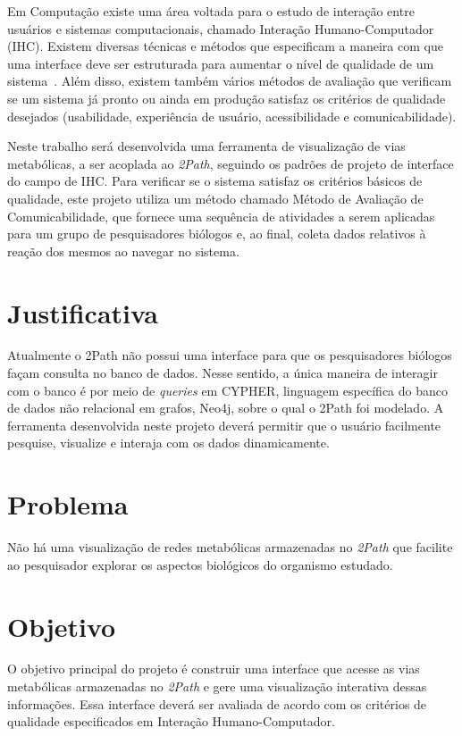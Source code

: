 \indent Em Computação existe uma área voltada para o estudo de interação entre usuários e sistemas computacionais, chamado Interação Humano-Computador (IHC). Existem diversas técnicas e métodos que especificam a maneira com que uma interface deve ser estruturada para aumentar o nível de qualidade de um sistema~\cite{IHCbook}. Além disso, existem também vários métodos de avaliação que verificam se um sistema já pronto ou ainda em produção satisfaz os critérios de qualidade~\cite{IHCbook} desejados (usabilidade, experiência de usuário, acessibilidade e comunicabilidade).

\indent Neste trabalho será desenvolvida uma ferramenta de visualização de vias metabólicas, a ser acoplada ao \textit{2Path}, seguindo os padrões de projeto de interface do campo de IHC. Para verificar se o sistema satisfaz os critérios básicos de qualidade, este projeto utiliza um método chamado Método de Avaliação de Comunicabilidade, que fornece uma sequência de atividades a serem aplicadas para um grupo de pesquisadores biólogos e, ao final, coleta dados relativos à reação dos mesmos ao navegar no sistema.


\section{Justificativa}
\indent Atualmente o 2Path não possui uma interface para que os pesquisadores biólogos façam consulta no banco de dados. Nesse sentido, a única maneira de interagir com o banco é por meio de \textit{queries} em CYPHER, linguagem específica do banco de dados não relacional em grafos, Neo4j, sobre o qual o 2Path foi modelado. A ferramenta desenvolvida neste projeto deverá permitir que o usuário facilmente pesquise, visualize e interaja com os dados dinamicamente.

\section{Problema}
\indent Não há uma visualização de redes metabólicas armazenadas no \textit{2Path} que facilite ao pesquisador explorar os aspectos biológicos do organismo estudado.

\section{Objetivo}
\indent O objetivo principal do projeto é construir uma interface que acesse as vias metabólicas armazenadas no \textit{2Path} e gere uma visualização interativa dessas informações. Essa interface deverá ser avaliada de acordo com os critérios de qualidade especificados em Interação Humano-Computador.

